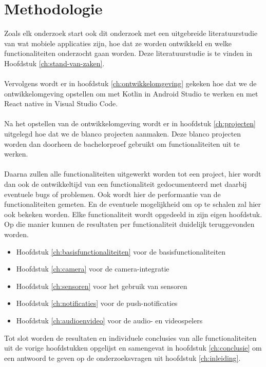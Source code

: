 
\chapter{Methodologie}
\label{ch:methodologie}


Zoals elk onderzoek start ook dit onderzoek met een uitgebreide literatuurstudie van wat mobiele applicaties zijn, 
hoe dat ze worden ontwikkeld en welke functionaliteiten onderzocht gaan worden. Deze literatuurstudie is te vinden in Hoofdstuk \ref{ch:stand-van-zaken}.
\\\\
Vervolgens wordt er in hoofdstuk \ref{ch:ontwikkelomgeving} gekeken hoe dat we de ontwikkelomgeving opstellen om met Kotlin in Android Studio 
te werken en met React native in Visual Studio Code.
\\\\
Na het opstellen van de ontwikkelomgeving wordt er in hoofdstuk \ref{ch:projecten} uitgelegd hoe dat we de blanco projecten aanmaken. 
Deze blanco projecten worden dan doorheen de bachelorproef gebruikt om functionaliteiten uit te werken.
\\\\
Daarna zullen alle functionaliteiten uitgewerkt worden tot een project, hier wordt dan ook de ontwikkeltijd van een functionaliteit 
gedocumenteerd met daarbij eventuele bugs of problemen. Ook wordt hier de performantie van de functionaliteiten gemeten. 
En de eventuele mogelijkheid om op te schalen zal hier ook bekeken worden. Elke functionaliteit wordt opgedeeld in zijn eigen hoofdstuk. 
Op die manier kunnen de resultaten per functionaliteit duidelijk teruggevonden worden.
\begin{itemize}
    \item Hoofdstuk \ref{ch:basisfunctionaliteiten} voor de basisfunctionaliteiten
    \item Hoofdstuk \ref{ch:camera} voor de camera-integratie
    \item Hoofdstuk \ref{ch:sensoren} voor het gebruik van sensoren
    \item Hoofdstuk \ref{ch:notificaties} voor de push-notificaties
    \item Hoofdstuk \ref{ch:audioenvideo} voor de audio- en videospelers
\end{itemize}
Tot slot worden de resultaten en individuele conclusies van alle functionaliteiten uit de vorige hoofdstukken opgelijst en samengevat 
in hoofdstuk \ref{ch:conclusie} om een antwoord te geven op de onderzoeksvragen uit hoofdstuk \ref{ch:inleiding}.

